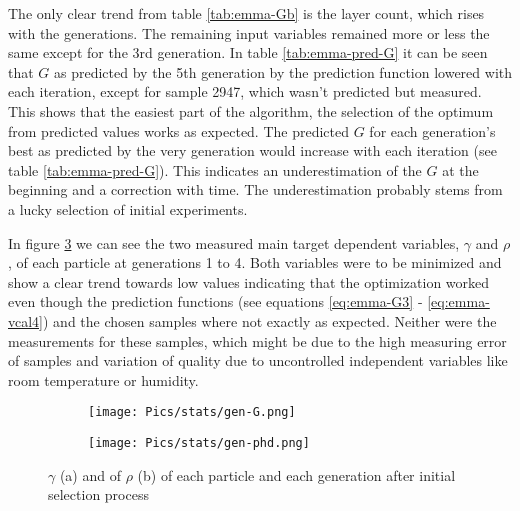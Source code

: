 The only clear trend from table \ref{tab:emma-Gb} is the layer count, which rises with the generations. 
The remaining input variables remained more or less the same except for the 3rd generation. 
%
In table \ref{tab:emma-pred-G} it can be seen that $G$ as predicted 
by the 5th generation by the prediction function lowered with each iteration, 
except for sample 2947, which wasn't predicted but measured. 
This shows that the easiest part of the algorithm, the selection of the optimum 
from predicted values works as expected. 
%
The predicted $G$ for each generation's best as predicted 
by the very generation would increase with each iteration (see table \ref{tab:emma-pred-G}). 
This indicates an underestimation of the $G$ at the beginning and a correction with time. 
The underestimation probably stems from a lucky selection of initial experiments. 

In figure \ref{fig:emma-gen} we can see the two measured main target dependent variables, $\gamma$ and $\rho$, of each particle at generations 1 to 4. 
Both variables were to be minimized and show a clear trend towards low values indicating 
that the optimization worked even though 
the prediction functions (see equations \ref{eq:emma-G3} - \ref{eq:emma-vcal4}) 
and the chosen samples where not exactly as expected. 
Neither were the measurements for these samples, which might be due to the high measuring error of samples and variation of quality due to uncontrolled independent variables like room temperature or humidity. 

\begin{figure}[hb]
    \centering
    \begin{subfigure}{.45\textwidth}
        \centering
        \texttt{[image: Pics/stats/gen-G.png]}
        \caption{} \label{fig:emma-G-gen}
    \end{subfigure}
    \begin{subfigure}{.45\textwidth}
        \centering
        \texttt{[image: Pics/stats/gen-phd.png]}
        \caption{} \label{fig:emma-phd-gen}
    \end{subfigure}
    \caption{$\gamma$ (a) and of $\rho$ (b) of each particle and each generation after initial selection process} 
    \label{fig:emma-gen}
\end{figure}

